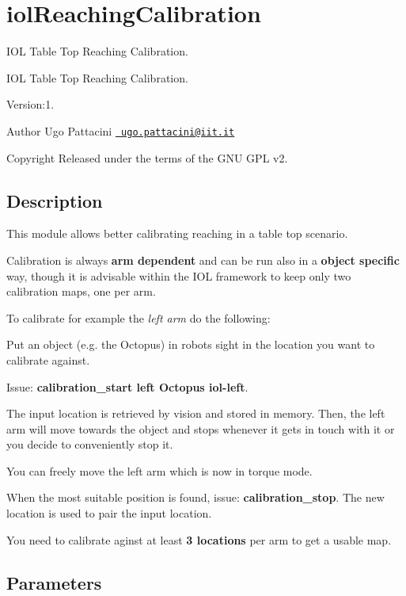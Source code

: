 \section{iol\+Reaching\+Calibration}
\label{group__iolReachingCalibration}


I\+OL Table Top Reaching Calibration.  


I\+OL Table Top Reaching Calibration. 

Version\+:1. \begin{DoxyAuthor}{Author}
Ugo Pattacini \href{mailto:ugo.pattacini@iit.it}{\texttt{ ugo.\+pattacini@iit.\+it}} ~\newline
 
\end{DoxyAuthor}
\begin{DoxyCopyright}{Copyright}
Released under the terms of the G\+NU G\+PL v2. 
\end{DoxyCopyright}
\hypertarget{group__iolReachingCalibration_intro_sec}{}\subsection{Description}\label{group__iolReachingCalibration_intro_sec}
This module allows better calibrating reaching in a table top scenario.

Calibration is always {\bfseries{arm dependent}} and can be run also in a {\bfseries{object specific}} way, though it is advisable within the I\+OL framework to keep only two calibration maps, one per arm.

To calibrate for example the {\itshape left arm} do the following\+:
\begin{DoxyItemize}
\item Put an object (e.\+g. the Octopus) in robot\textquotesingle{}s sight in the location you want to calibrate against.
\item Issue\+: {\bfseries{calibration\+\_\+start left Octopus iol-\/left}}.
\item The input location is retrieved by vision and stored in memory. Then, the left arm will move towards the object and stops whenever it gets in touch with it or you decide to conveniently stop it.
\item You can freely move the left arm which is now in torque mode.
\item When the most suitable position is found, issue\+: {\bfseries{calibration\+\_\+stop}}. The new location is used to pair the input location.
\item You need to calibrate aginst at least {\bfseries{3 locations}} per arm to get a usable map.
\end{DoxyItemize}\hypertarget{group__iolReachingCalibration_parameters_sec}{}\subsection{Parameters}\label{group__iolReachingCalibration_parameters_sec}

